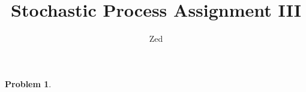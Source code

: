 \documentclass[a4paper, 10pt]{article}
\title{\textbf{Stochastic Process Assignment III}}
\author{Zed}
\theoremstyle{definition}
\newtheorem{problem}{Problem}
\theoremstyle{hSol}
\begin{document}
\maketitle
\begin{problem} 
\end{problem}
\end{document}

